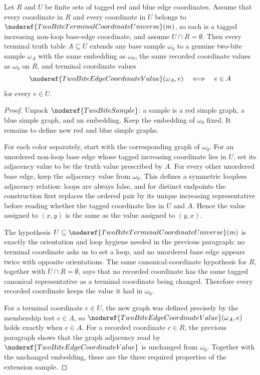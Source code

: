 \begin{helper}
Let \(R\) and \(U\) be finite sets of tagged red and blue edge coordinates.
Assume that every coordinate in \(R\) and every coordinate in \(U\) belongs
to \(\noderef{TwoBiteTerminalCoordinateUniverse}(m)\), so each is a tagged
increasing non-loop base-edge coordinate, and assume \(U\cap R=\emptyset\).
Then every terminal truth table \(A\subseteq U\) extends any base sample
\(\omega_0\) to a genuine two-bite sample \(\omega_A\) with the same
embedding as \(\omega_0\), the same recorded coordinate values as
\(\omega_0\) on \(R\), and terminal coordinate values
\[
\noderef{TwoBiteEdgeCoordinateValue}(\omega_A,e)
  \quad\Longleftrightarrow\quad e\in A
\]
for every \(e\in U\).
\end{helper}
\begin{proof}
Unpack \(\noderef{TwoBiteSample}\): a sample is a red simple graph, a blue
simple graph, and an embedding.  Keep the embedding of \(\omega_0\) fixed.
It remains to define new red and blue simple graphs.

For each color separately, start with the corresponding graph of
\(\omega_0\).  For an unordered non-loop base edge whose tagged increasing
coordinate lies in \(U\), set its adjacency value to be the truth value
prescribed by \(A\).  For every other unordered base edge, keep the adjacency
value from \(\omega_0\).  This defines a symmetric loopless adjacency
relation: loops are always false, and for distinct endpoints the construction
first replaces the ordered pair by its unique increasing representative
before reading whether the tagged coordinate lies in \(U\) and \(A\).  Hence
the value assigned to \((x,y)\) is the same as the value assigned to
\((y,x)\).

The hypothesis \(U\subseteq\noderef{TwoBiteTerminalCoordinateUniverse}(m)\)
is exactly the orientation and loop hygiene needed in the previous paragraph:
no terminal coordinate asks us to set a loop, and no unordered base edge
appears twice with opposite orientations.  The same canonical-coordinate
hypothesis for \(R\), together with \(U\cap R=\emptyset\), says that no
recorded coordinate has the same tagged canonical representative as a
terminal coordinate being changed.  Therefore every recorded coordinate keeps
the value it had in \(\omega_0\).

For a terminal coordinate \(e\in U\), the new graph was defined precisely by
the membership test \(e\in A\), so
\(\noderef{TwoBiteEdgeCoordinateValue}(\omega_A,e)\) holds exactly when
\(e\in A\).  For a recorded coordinate \(c\in R\), the previous paragraph
shows that the graph adjacency read by
\(\noderef{TwoBiteEdgeCoordinateValue}\) is unchanged from \(\omega_0\).
Together with the unchanged embedding, these are the three required
properties of the extension sample.
\end{proof}
